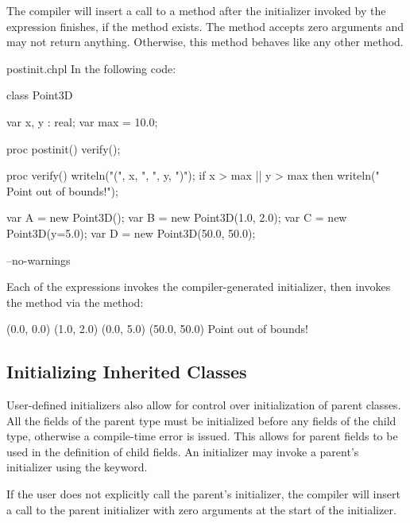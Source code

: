The compiler will insert a call to a  method after the
initializer invoked by the  expression finishes, if the method
exists. The  method accepts zero arguments and may not return
anything. Otherwise, this method behaves like any other method.

\begin{chapelexample}{postinit.chpl}
In the following code:
\begin{chapel}
class Point3D {
  var x, y : real;
  var max = 10.0;

  proc postinit() {
    verify();
  }

  proc verify() {
    writeln("(", x, ", ", y, ")");
    if x > max || y > max then
      writeln("  Point out of bounds!");
  }
}

var A = new Point3D();
var B = new Point3D(1.0, 2.0);
var C = new Point3D(y=5.0);
var D = new Point3D(50.0, 50.0);
\end{chapel}
\begin{chapelcompopts}
--no-warnings
\end{chapelcompopts}
Each of the  expressions invokes the compiler-generated initializer,
then invokes the  method via the  method:
\begin{chapelprintoutput}{}
(0.0, 0.0)
(1.0, 2.0)
(0.0, 5.0)
(50.0, 50.0)
  Point out of bounds!
\end{chapelprintoutput}
\end{chapelexample}

\subsection{Initializing Inherited Classes}
\label{Initializing_Inherited}

User-defined initializers also allow for control over initialization of parent
classes. All the fields of the parent type must be initialized before any
fields of the child type, otherwise a compile-time error is issued. This allows
for parent fields to be used in the definition of child fields. An initializer
may invoke a parent's initializer using the  keyword.

If the user does not explicitly call the parent's initializer, the compiler
will insert a call to the parent initializer with zero arguments at the start
of the initializer.

